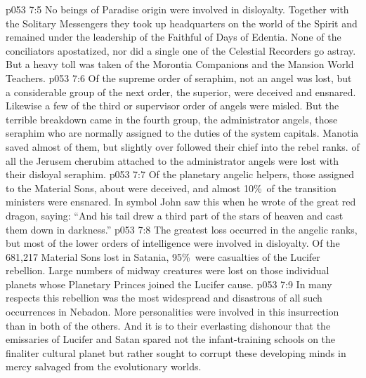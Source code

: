 \vs p053 7:5 No beings of Paradise origin were involved in disloyalty. Together with the Solitary Messengers they took up headquarters on the world of the Spirit and remained under the leadership of the Faithful of Days of Edentia. None of the conciliators apostatized, nor did a single one of the Celestial Recorders go astray. But a heavy toll was taken of the Morontia Companions and the Mansion World Teachers.
\vs p053 7:6 Of the supreme order of seraphim, not an angel was lost, but a considerable group of the next order, the superior, were deceived and ensnared. Likewise a few of the third or supervisor order of angels were misled. But the terrible breakdown came in the fourth group, the administrator angels, those seraphim who are normally assigned to the duties of the system capitals. Manotia saved almost  of them, but slightly over  followed their chief into the rebel ranks.  of all the Jerusem cherubim attached to the administrator angels were lost with their disloyal seraphim.
\vs p053 7:7 Of the planetary angelic helpers, those assigned to the Material Sons, about  were deceived, and almost 10\%\ of the transition ministers were ensnared. In symbol John saw this when he wrote of the great red dragon, saying: “And his tail drew a third part of the stars of heaven and cast them down in darkness.”
\vs p053 7:8 The greatest loss occurred in the angelic ranks, but most of the lower orders of intelligence were involved in disloyalty. Of the 681,217 Material Sons lost in Satania, 95\%\ were casualties of the Lucifer rebellion. Large numbers of midway creatures were lost on those individual planets whose Planetary Princes joined the Lucifer cause.
\vs p053 7:9 \pc In many respects this rebellion was the most widespread and disastrous of all such occurrences in Nebadon. More personalities were involved in this insurrection than in both of the others. And it is to their everlasting dishonour that the emissaries of Lucifer and Satan spared not the infant\hyp{}training schools on the finaliter cultural planet but rather sought to corrupt these developing minds in mercy salvaged from the evolutionary worlds.

